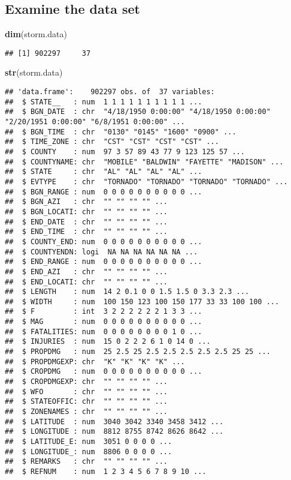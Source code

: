 \documentclass[
]{article}
\newenvironment{Shaded}{\begin{snugshade}}{\end{snugshade}}
\newcommand{\KeywordTok}[1]{\textcolor[rgb]{0.13,0.29,0.53}{\textbf{#1}}}
\newcommand{\NormalTok}[1]{#1}
\begin{document}
\hypertarget{examine-the-data-set}{%
\subsection{Examine the data set}\label{examine-the-data-set}}

\begin{Shaded}
\begin{Highlighting}[]
\KeywordTok{dim}\NormalTok{(storm.data)}
\end{Highlighting}
\end{Shaded}

\begin{verbatim}
## [1] 902297     37
\end{verbatim}

\begin{Shaded}
\begin{Highlighting}[]
\KeywordTok{str}\NormalTok{(storm.data)}
\end{Highlighting}
\end{Shaded}

\begin{verbatim}
## 'data.frame':    902297 obs. of  37 variables:
##  $ STATE__   : num  1 1 1 1 1 1 1 1 1 1 ...
##  $ BGN_DATE  : chr  "4/18/1950 0:00:00" "4/18/1950 0:00:00" "2/20/1951 0:00:00" "6/8/1951 0:00:00" ...
##  $ BGN_TIME  : chr  "0130" "0145" "1600" "0900" ...
##  $ TIME_ZONE : chr  "CST" "CST" "CST" "CST" ...
##  $ COUNTY    : num  97 3 57 89 43 77 9 123 125 57 ...
##  $ COUNTYNAME: chr  "MOBILE" "BALDWIN" "FAYETTE" "MADISON" ...
##  $ STATE     : chr  "AL" "AL" "AL" "AL" ...
##  $ EVTYPE    : chr  "TORNADO" "TORNADO" "TORNADO" "TORNADO" ...
##  $ BGN_RANGE : num  0 0 0 0 0 0 0 0 0 0 ...
##  $ BGN_AZI   : chr  "" "" "" "" ...
##  $ BGN_LOCATI: chr  "" "" "" "" ...
##  $ END_DATE  : chr  "" "" "" "" ...
##  $ END_TIME  : chr  "" "" "" "" ...
##  $ COUNTY_END: num  0 0 0 0 0 0 0 0 0 0 ...
##  $ COUNTYENDN: logi  NA NA NA NA NA NA ...
##  $ END_RANGE : num  0 0 0 0 0 0 0 0 0 0 ...
##  $ END_AZI   : chr  "" "" "" "" ...
##  $ END_LOCATI: chr  "" "" "" "" ...
##  $ LENGTH    : num  14 2 0.1 0 0 1.5 1.5 0 3.3 2.3 ...
##  $ WIDTH     : num  100 150 123 100 150 177 33 33 100 100 ...
##  $ F         : int  3 2 2 2 2 2 2 1 3 3 ...
##  $ MAG       : num  0 0 0 0 0 0 0 0 0 0 ...
##  $ FATALITIES: num  0 0 0 0 0 0 0 0 1 0 ...
##  $ INJURIES  : num  15 0 2 2 2 6 1 0 14 0 ...
##  $ PROPDMG   : num  25 2.5 25 2.5 2.5 2.5 2.5 2.5 25 25 ...
##  $ PROPDMGEXP: chr  "K" "K" "K" "K" ...
##  $ CROPDMG   : num  0 0 0 0 0 0 0 0 0 0 ...
##  $ CROPDMGEXP: chr  "" "" "" "" ...
##  $ WFO       : chr  "" "" "" "" ...
##  $ STATEOFFIC: chr  "" "" "" "" ...
##  $ ZONENAMES : chr  "" "" "" "" ...
##  $ LATITUDE  : num  3040 3042 3340 3458 3412 ...
##  $ LONGITUDE : num  8812 8755 8742 8626 8642 ...
##  $ LATITUDE_E: num  3051 0 0 0 0 ...
##  $ LONGITUDE_: num  8806 0 0 0 0 ...
##  $ REMARKS   : chr  "" "" "" "" ...
##  $ REFNUM    : num  1 2 3 4 5 6 7 8 9 10 ...
\end{verbatim}
\end{document}
